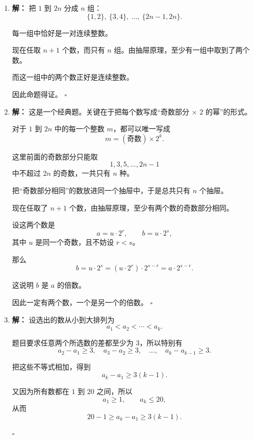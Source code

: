 \documentclass[11pt,a4paper,fontset=fandol]{ctexart}
\theoremstyle{formalexample}
\newenvironment{solution}{\par\noindent\textbf{解：}}{\hfill$\square$\par}
\begin{document}
\begin{enumerate}
\begin{solution}
  同一小线段的长度不超过 $\dfrac{1}{12}$，所以这两个点之间的距离不超过
  \[
  \frac{1}{12}.
  \]
  \end{solution}

  \item \begin{solution}
  把 $1$ 到 $2n$ 分成 $n$ 组：
  \[
  \{1,2\},\ \{3,4\},\ \ldots,\ \{2n-1,2n\}.
  \]

  每一组中恰好是一对连续整数。

  现在任取 $n+1$ 个数，而只有 $n$ 组。由抽屉原理，至少有一组中取到了两个数。

  而这一组中的两个数正好是连续整数。

  因此命题得证。
  \end{solution}

  \item \begin{solution}
  这是一个经典题。关键在于把每个数写成“奇数部分 $\times$ $2$ 的幂”的形式。

  对于 $1$ 到 $2n$ 中的每一个整数 $m$，都可以唯一写成
  \[
  m=(\text{奇数})\times 2^k.
  \]

  这里前面的奇数部分只能取
  \[
  1,3,5,\ldots,2n-1
  \]
  中不超过 $2n$ 的奇数，一共只有 $n$ 种。

  把“奇数部分相同”的数放进同一个抽屉中，于是总共只有 $n$ 个抽屉。

  现在任取了 $n+1$ 个数，由抽屉原理，至少有两个数的奇数部分相同。

  设这两个数是
  \[
  a=u\cdot 2^r,
  \qquad
  b=u\cdot 2^s,
  \]
  其中 $u$ 是同一个奇数，且不妨设 $r<s$。

  那么
  \[
  b=u\cdot 2^s=(u\cdot 2^r)\cdot 2^{s-r}=a\cdot 2^{s-r}.
  \]

  这说明 $b$ 是 $a$ 的倍数。

  因此一定有两个数，一个是另一个的倍数。
  \end{solution}

  \item \begin{solution}
  设选出的数从小到大排列为
  \[
  a_1<a_2<\cdots<a_k.
  \]

  题目要求任意两个所选数的差都至少为 $3$，所以特别有
  \[
  a_2-a_1\ge 3,\quad a_3-a_2\ge 3,\quad \ldots,\quad a_k-a_{k-1}\ge 3.
  \]

  把这些不等式相加，得到
  \[
  a_k-a_1\ge 3(k-1).
  \]

  又因为所有数都在 $1$ 到 $20$ 之间，所以
  \[
  a_1\ge 1,\qquad a_k\le 20,
  \]
  从而
  \[
  20-1\ge a_k-a_1\ge 3(k-1).
  \]


\end{solution}
\end{enumerate}
\end{document}
